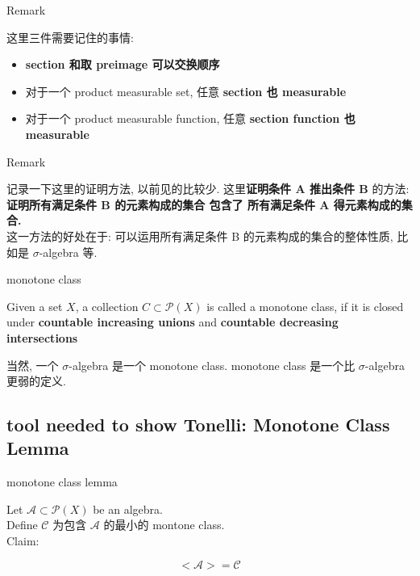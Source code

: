 \documentclass{qlnotes-export}
\begin{document}
\begin{qlremark}{Remark}

这里三件需要记住的事情:

\begin{itemize}
\item
  \textbf{section 和取 preimage 可以交换顺序}
\item
  对于一个 product measurable set, 任意 \textbf{section 也 measurable}
\item
  对于一个 product measurable function, 任意 \textbf{section function 也 measurable}
\end{itemize}

\end{qlremark}

\begin{qlremark}{Remark}

记录一下这里的证明方法, 以前见的比较少. 这里\textbf{证明条件 A 推出条件 B} 的方法: \textbf{证明所有满足条件 B 的元素构成的集合 包含了 所有满足条件 A 得元素构成的集合.}\\
这一方法的好处在于: 可以运用所有满足条件 B 的元素构成的集合的整体性质, 比如是 \(\sigma\)-algebra 等.

\end{qlremark}

\begin{definition}{monotone class}\label{def-06-product-measure-fubini-tonelli-monotone-class}

Given a set \(X\), a collection \(C \subset \mathcal{P}(X)\) is called a monotone class, if it is closed under \textbf{countable increasing unions} and \textbf{countable decreasing intersections}

\end{definition}

当然, 一个 \(\sigma\)-algebra 是一个 monotone class. monotone class 是一个比 \(\sigma\)-algebra 更弱的定义.

\subsection{tool needed to show Tonelli: Monotone Class Lemma}\label{tool-needed-to-show-tonelli-monotone-class-lemma}

\begin{lemma}{monotone class lemma}\label{lem-06-product-measure-fubini-tonelli-monotone-class-lemma}

Let \(\mathcal{A} \subset \mathcal{P}(X)\) be an algebra.\\
Define \(\mathcal{C}\) 为包含 \(\mathcal{A}\) 的最小的 montone class.\\
Claim:

\[< \mathcal{A} > = \mathcal{C}\]

\end{lemma}
\end{document}
